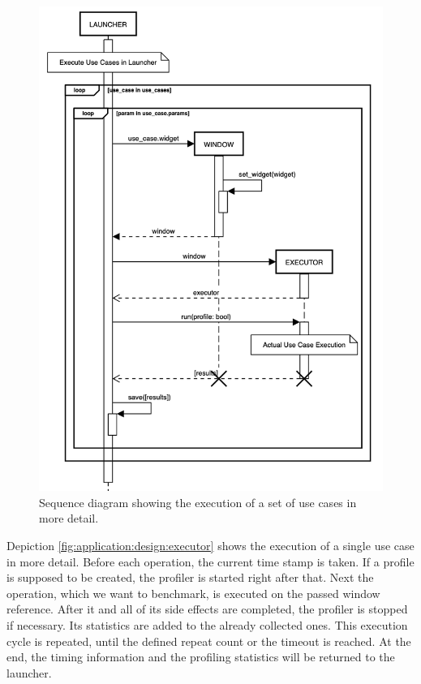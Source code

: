 \begin{figure}[h]
    \centering
    \includegraphics[width=12cm]{resources/img/sequence/launcher}
    \caption{
        Sequence diagram showing the execution of a set of use cases in more
        detail.
    }
    \label{fig:application:design:launcher}
\end{figure}

Depiction \ref{fig:application:design:executor} shows the execution of a single
use case in more detail. Before each operation, the current time stamp is taken.
If a profile is supposed to be created, the profiler is started right after
that.  Next the operation, which we want to benchmark, is executed on the passed
window reference. After it and all of its side effects are completed, the
profiler is stopped if necessary. Its statistics are added to the already
collected ones. This execution cycle is repeated, until the defined repeat count
or the timeout is reached. At the end, the timing information and the profiling
statistics will be returned to the launcher.

